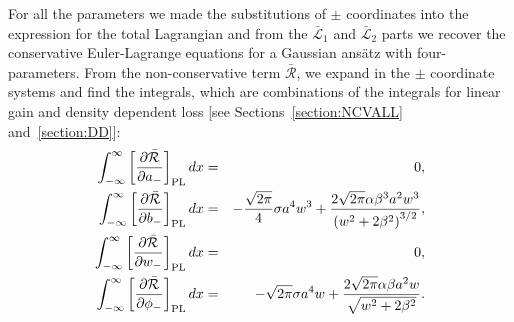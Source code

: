 {For all the parameters we made the substitutions of $\pm$ coordinates into the expression for the total Lagrangian and from the $
\bar{\mathcal{L}}_1$ and $\bar{\mathcal{L}}_2$ parts we recover the conservative Euler-Lagrange equations for a Gaussian ans\"{a}tz with 
four-parameters.
From the non-conservative term $\bar{\mathcal{R}}$, we expand in the $\pm$ coordinate systems and find the integrals, which are combinations of the 
integrals for linear gain and density dependent loss [see Sections~\ref{section:NCVALL} and~\ref{section:DD}]:
\begin{eqnarray}
\int_{-\infty}^{\infty} \left[ \frac{\partial  \bar{\mathcal{R}}}{\partial a_-} \right]_{\rm PL} dx &=& 0,  \nonumber  \\
\int_{-\infty}^{\infty} \left[ \frac{\partial  \bar{\mathcal{R}}}{\partial b_-} \right]_{\rm PL} dx &=& -\frac{\sqrt{2\pi}}{4}  \sigma a^4 w^3 + \frac{2\sqrt{2\pi} \alpha \beta^3 a^2 w^3}{\left( w^2 + 2\beta^2 \right)^{3/2}} , \nonumber \\
\int_{-\infty}^{\infty} \left[ \frac{\partial  \bar{\mathcal{R}}}{\partial w_-} \right]_{\rm PL} dx &=& 0, \nonumber \\
\int_{-\infty}^{\infty} \left[ \frac{\partial  \bar{\mathcal{R}}}{\partial \phi_-} \right]_{\rm PL} dx &=& -\sqrt{2\pi} \sigma a^4 w + \frac{2\sqrt{2\pi} \alpha \beta a^2 w}{\sqrt{w^2 + 2 \beta^2}}  .\nonumber
\end{eqnarray}
}

